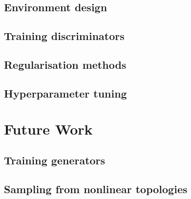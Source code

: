 \documentclass[a4paper,11pt]{article}
\begin{document}
\subsection{Environment design}

\subsection{Training discriminators}

\subsection{Regularisation methods}

\subsection{Hyperparameter tuning}

\section{Future Work}

\subsection{Training generators}

\subsection{Sampling from nonlinear topologies}
\end{document}

